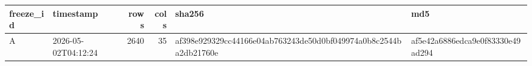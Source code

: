 \begin{tabular}{llrrll}
\toprule
freeze\_id & timestamp & rows & cols & sha256 & md5 \\
\midrule
A & 2026-05-02T04:12:24 & 2640 & 35 & af398e929329cc44166e04ab763243de50d0bf049974a0b8c2544ba2db21760e & af5e42a6886edca9e0f83330e49ad294 \\
\bottomrule
\end{tabular}

